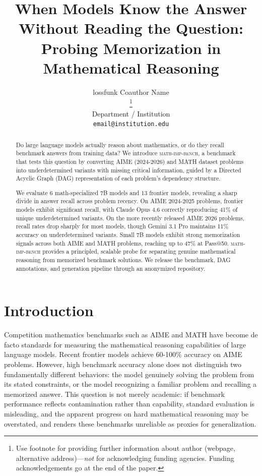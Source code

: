 \documentclass{article} %
\title{When Models Know the Answer Without Reading the Question: Probing
   Memorization in Mathematical Reasoning}
\author{lossfunk \And Coauthor Name \\
\thanks{Use footnote for providing further information about author (webpage, alternative address)---\emph{not} for acknowledging funding agencies. Funding acknowledgements go at the end of the paper.} \\
Department / Institution \\
\texttt{email@institution.edu}}
\newcommand{\benchname}{\textsc{math-imp-bench}}
\begin{document}
\ifcolmsubmission
\linenumbers
\fi

\maketitle

\begin{abstract}
Do large language models actually reason about mathematics, or do they recall benchmark answers from training data? We introduce \benchname{}, a benchmark that tests this question by converting AIME (2024-2026) and MATH dataset problems into underdetermined variants with missing critical information, guided by a Directed Acyclic Graph (DAG) representation of each problem's dependency structure.

We evaluate 6 math-specialized 7B models and 13 frontier models, revealing a sharp divide in answer recall across problem recency. On AIME 2024-2025 problems, frontier models exhibit significant recall, with Claude Opus 4.6 correctly reproducing 41\% of unique underdetermined variants. On the more recently released AIME 2026 problems, recall rates drop sharply for most models, though Gemini 3.1 Pro maintains 11\% accuracy on underdetermined variants. Small 7B models exhibit strong memorization signals across both AIME and MATH problems, reaching up to 47\% at Pass@50. \benchname{} provides a principled, scalable probe for separating genuine mathematical reasoning from memorized benchmark solutions. We release the benchmark, DAG annotations, and generation pipeline through an anonymized repository.


\end{abstract}

\section{Introduction}
\label{sec:intro}

Competition mathematics benchmarks such as AIME and MATH have become de facto standards for measuring the mathematical reasoning capabilities of large language models. Recent frontier models achieve 60-100\% accuracy on AIME problems. However, high benchmark accuracy alone does not distinguish two fundamentally different behaviors: the model genuinely solving the problem from its stated constraints, or the model recognizing a familiar problem and recalling a memorized answer. This question is not merely academic: if benchmark performance reflects contamination rather than capability, standard evaluation is misleading, and the apparent progress on hard mathematical reasoning may be overstated, and renders these benchmarks unreliable as proxies for generalization.
\end{document}
